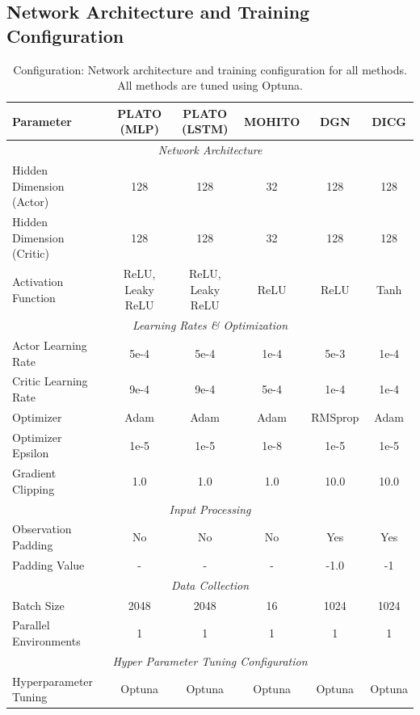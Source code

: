\subsection{Network Architecture and Training Configuration}\label{network_architecture}


\begin{table}[h]
\centering
\small
\setlength{\tabcolsep}{5pt}
\begin{tabular}{|l|c|c|c|c|c|}
\hline
\textbf{Parameter} & \textbf{PLATO (MLP)} & \textbf{PLATO (LSTM)} & \textbf{MOHITO} & \textbf{DGN} & \textbf{DICG} \\
\hline
\multicolumn{6}{|c|}{\textit{Network Architecture}} \\
\hline
Hidden Dimension (Actor) & 128 & 128 & 32 & 128 & 128 \\
Hidden Dimension (Critic) & 128 & 128 & 32 & 128 & 128 \\
Activation Function & ReLU, Leaky ReLU & ReLU, Leaky ReLU & ReLU & ReLU & Tanh \\
\hline
\multicolumn{6}{|c|}{\textit{Learning Rates \& Optimization}} \\
\hline
Actor Learning Rate & 5e-4 & 5e-4 & 1e-4 & 5e-3 & 1e-4 \\
Critic Learning Rate & 9e-4 & 9e-4 & 5e-4 & 1e-4 & 1e-4 \\
Optimizer & Adam & Adam & Adam & RMSprop & Adam \\
Optimizer Epsilon & 1e-5 & 1e-5 & 1e-8 & 1e-5 & 1e-5 \\
Gradient Clipping & 1.0 & 1.0 & 1.0 & 10.0 & 10.0 \\
\hline
\multicolumn{6}{|c|}{\textit{Input Processing}} \\
\hline
Observation Padding & No & No & No & Yes & Yes \\
Padding Value & - & - & - & -1.0 & -1 \\
\hline
\multicolumn{6}{|c|}{\textit{Data Collection}} \\
\hline
Batch Size & 2048 & 2048 & 16 & 1024 & 1024 \\
Parallel Environments & 1 & 1 & 1 & 1 & 1 \\
\hline
\multicolumn{6}{|c|}{\textit{Hyper Parameter Tuning Configuration}} \\
\hline
Hyperparameter Tuning & Optuna & Optuna & Optuna & Optuna & Optuna \\
\hline
\end{tabular}
\caption{Configuration: Network architecture and training configuration for all methods. All methods are tuned using Optuna\cite{akiba2019optuna}. }
\label{tab:network_architecture}
\end{table}


